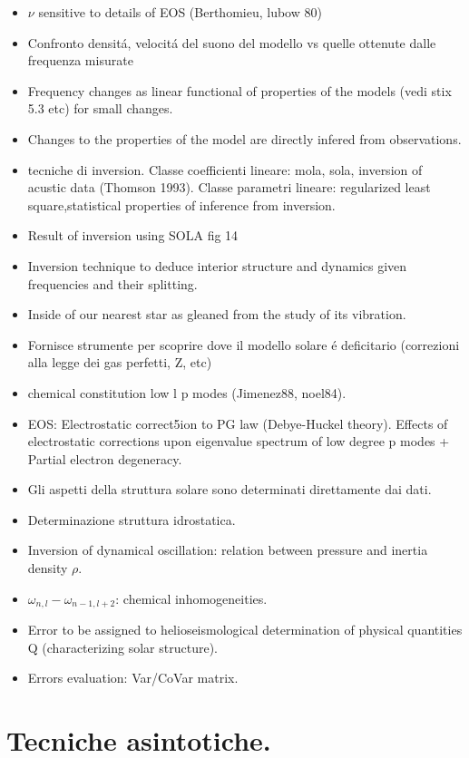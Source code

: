\documentclass[oneside,12pt,fleqn]{memoir}
\begin{document}
{\begin{itemize}
    \item $\nu$ sensitive to details of EOS (Berthomieu, lubow 80)
    \item Confronto densit\'a, velocit\'a del suono del modello vs quelle ottenute dalle frequenza misurate
    \item Frequency changes as linear functional of properties of the models (vedi stix 5.3 etc) for small changes.
    \item Changes to the properties of the model are directly infered from observations.
    \item tecniche di inversion. Classe coefficienti lineare: mola, sola, inversion of acustic data (Thomson 1993). Classe parametri lineare: regularized least square,statistical properties of inference from inversion.
    \item Result of inversion using SOLA fig 14
    \item Inversion technique to deduce interior structure and dynamics given frequencies and their splitting.
    \item Inside of our nearest star as gleaned from the study of its vibration.
    \item Fornisce strumente per scoprire dove il modello solare \'e deficitario (correzioni alla legge dei gas perfetti, Z, etc)
    \item chemical constitution low l p modes (Jimenez88, noel84).
    \item EOS: Electrostatic correct5ion to PG law (Debye-Huckel theory). Effects of electrostatic corrections upon eigenvalue spectrum of low degree p modes + Partial electron degeneracy.
    \item Gli aspetti della struttura solare sono determinati direttamente dai dati.
    \item Determinazione struttura idrostatica.
    \item Inversion of dynamical oscillation: relation between pressure and inertia density $\rho$.
    \item $\omega_{n,l}-\omega_{n-1,l+2}$: chemical inhomogeneities.
    \item Error to be assigned to helioseismological determination of physical quantities Q (characterizing solar structure).
    \item Errors evaluation: Var/CoVar matrix.
\end{itemize}


\section{Tecniche asintotiche.}

}
\end{document}
